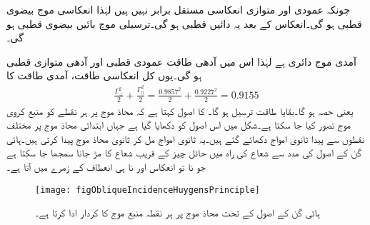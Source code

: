 چونکہ عمودی اور متوازی انعکاسی مستقل برابر نہیں ہیں لہٰذا انعکاسی موج بیضوی قطبی ہو گی۔انعکاس کے بعد یہ دائیں قطبی ہو گی۔ترسیلی موج بائیں بیضوی قطبی ہو گی۔

آمدی موج دائری ہے لہٰذا اس میں آدھی طاقت عمودی قطبی اور آدھی متوازی قطبی ہو گی۔یوں کل انعکاسی طاقت، آمدی طاقت کا
\begin{align*}
\frac{\Gamma_{\perp}^2}{2}+\frac{\Gamma_{\parallel}^2}{2}=\frac{0.9857^2}{2}+\frac{0.9227^2}{2}=0.9155
\end{align*}
یعنی  حصہ ہو گا۔بقایا  طاقت ترسیل ہو گا۔
 کا اصول کہتا ہے کہ محاذ موج پر ہر نقطے کو منبع کروی موج تصور کیا جا سکتا ہے۔شکل  میں اس اصول کو دکھایا گیا ہے جہاں ابتدائی محاذ موج پر مختلف نقطوں سے پیدا ثانوی امواج دکھائے گئے ہیں۔یہ ثانوی امواج مل کر ثانوی محاذ موج پیدا کرتی ہیں۔ہائی گن کے اصول کی مدد سے شعاع کی راہ میں حائل چیز کے قریب شعاع کا مڑ جانا سمجھا جا سکتا ہے جو نا تو انعکاس اور نا ہی انعطاف کے زمرے میں آتا ہے۔   

\begin{figure}
\centering
\texttt{[image: figObliqueIncidenceHuygensPrinciple]}
\caption{ہائی گن کے اصول کے تحت محاذ موج پر ہر نقطہ منبع موج کا کردار ادا کرتا ہے۔}
\label{شکل_ترچھی_ہائی_گن_اصول}
\end{figure}

